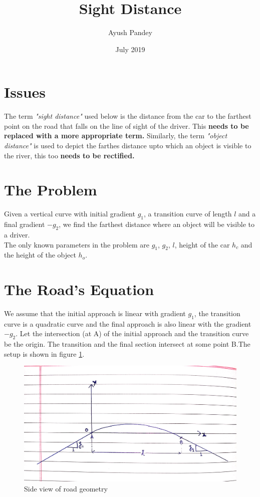 \documentclass{article}
\title{Sight Distance}
\author{Ayush Pandey}
\date{July 2019}
\begin{document}
\maketitle

\section{Issues}
    The term \emph{"sight distance"} used below is the distance from the car to the farthest point on the road that falls on the line of sight of the driver. This \textbf{needs to be replaced with a more appropriate term.} Similarly, the term \emph{"object distance"} is used to depict the farthes distance upto which an object is visible to the river, this too \textbf{needs to be rectified.}

\section{The Problem}
    Given a vertical curve with initial gradient $g_{1}$, a transition curve of length $l$ and a final gradient $-g_{2}$, we find the farthest distance where an object will be visible to a driver.\\
    The only known parameters in the problem are $g_{1}$, $g_{2}$, $l$, height of the car $h_{c}$ and the height of the object $h_{o}$.
    
\section{The Road's Equation}
    We assume that the initial approach is linear with gradient $g_{1}$, the transition curve is a quadratic curve and the final approach is also linear with the gradient $-g_{2}$. Let the intersection (at A) of the initial approach  and the transition curve be the origin. The transition and the final section intersect at some point B.The setup is shown in figure \ref{fig:RoadEqn}.
    
    \begin{figure}[h]
        \centering
        \includegraphics[width = \textwidth]{RoadEqn.jpg}
        \caption{Side view of road geometry}
        \label{fig:RoadEqn}
    \end{figure}
    
\end{document}
